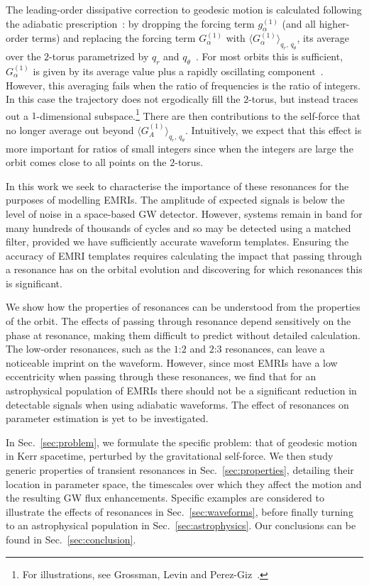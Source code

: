\documentclass[aps,prd,amsfonts,amssymb,amsmath,nofootinbib,showpacs,superscriptaddress,twocolumn,floatfix]{revtex4-1}
\newcommand{\secref}[1]{Sec.~\ref{sec:#1}}
\begin{document}
The leading-order dissipative correction to geodesic motion is calculated following the adiabatic prescription~\cite{Hinderer2008}: by dropping the forcing term $g_\alpha^{(1)}$ (and all higher-order terms) and replacing the forcing term $G_\alpha^{(1)}$ with $\langle G_\alpha^{(1)}\rangle_{q_r,\,q_\theta}$, its average over the $2$-torus parametrized by $q_r$ and $q_\theta$~\cite{Drasco2005}. For most orbits this is sufficient, $G_\alpha^{(1)}$ is given by its average value plus a rapidly oscillating component~\cite{Arnold1988}. %
However, this averaging fails when the ratio of frequencies is the ratio of integers. In this case the trajectory does not ergodically fill the $2$-torus, but instead traces out a $1$-dimensional subspace.\footnote{For illustrations, see Grossman, Levin and Perez-Giz~\cite{Grossman2012}.} There are then contributions to the self-force that no longer average out beyond $\langle G_A^{(1)}\rangle_{q_r,\,q_\theta}$. Intuitively, we expect that this effect is more important for ratios of small integers since when the integers are large the orbit comes close to all points on the $2$-torus.

In this work we seek to characterise the importance of these resonances for the purposes of modelling EMRIs. The amplitude of expected signals is below the level of noise in a space-based GW detector. However, systems remain in band for many hundreds of thousands of cycles and so may be detected using a matched filter, provided we have sufficiently accurate waveform templates. Ensuring the accuracy of EMRI templates requires calculating the impact that passing through a resonance has on the orbital evolution and discovering for which resonances this is significant.

We show how the properties of resonances can be understood from the properties of the orbit. The effects of passing through resonance depend sensitively on the phase at resonance, making them difficult to predict without detailed calculation. The low-order resonances, such as the $1$:$2$ and $2$:$3$ resonances, can leave a noticeable imprint on the waveform. However, since most EMRIs have a low eccentricity when passing through these resonances, we find that for an astrophysical population of EMRIs there should not be a significant reduction in detectable signals when using adiabatic waveforms. The effect of resonances on parameter estimation is yet to be investigated.

In \secref{problem}, we formulate the specific problem: that of geodesic motion in Kerr spacetime, perturbed  by the gravitational self-force. We then study generic properties of transient resonances in \secref{properties}, detailing their location in parameter space, the timescales over which they affect the motion and the resulting GW flux enhancements. Specific examples are considered to illustrate the effects of resonances in \secref{waveforms}, before finally turning to an astrophysical population in \secref{astrophysics}. Our conclusions can be found in \secref{conclusion}.
\end{document}
